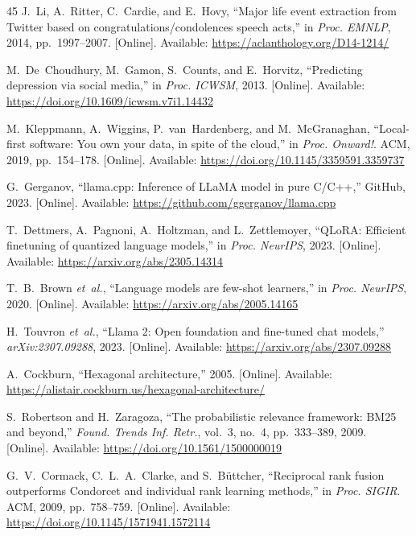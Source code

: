 \documentclass[conference]{IEEEtran}
\begin{document}
\begin{thebibliography}{45}
J.~Li, A.~Ritter, C.~Cardie, and E.~Hovy, ``Major life event extraction from Twitter based on congratulations/condolences speech acts,'' in \emph{Proc. EMNLP}, 2014, pp.~1997--2007. [Online]. Available: \url{https://aclanthology.org/D14-1214/}

M.~De~Choudhury, M.~Gamon, S.~Counts, and E.~Horvitz, ``Predicting depression via social media,'' in \emph{Proc. ICWSM}, 2013. [Online]. Available: \url{https://doi.org/10.1609/icwsm.v7i1.14432}

M.~Kleppmann, A.~Wiggins, P.~van~Hardenberg, and M.~McGranaghan, ``Local-first software: You own your data, in spite of the cloud,'' in \emph{Proc. Onward!}. ACM, 2019, pp.~154--178. [Online]. Available: \url{https://doi.org/10.1145/3359591.3359737}

G.~Gerganov, ``llama.cpp: Inference of LLaMA model in pure C/C++,'' GitHub, 2023. [Online]. Available: \url{https://github.com/ggerganov/llama.cpp}

T.~Dettmers, A.~Pagnoni, A.~Holtzman, and L.~Zettlemoyer, ``QLoRA: Efficient finetuning of quantized language models,'' in \emph{Proc. NeurIPS}, 2023. [Online]. Available: \url{https://arxiv.org/abs/2305.14314}

T.~B.~Brown \emph{et~al.}, ``Language models are few-shot learners,'' in \emph{Proc. NeurIPS}, 2020. [Online]. Available: \url{https://arxiv.org/abs/2005.14165}

H.~Touvron \emph{et~al.}, ``Llama 2: Open foundation and fine-tuned chat models,'' \emph{arXiv:2307.09288}, 2023. [Online]. Available: \url{https://arxiv.org/abs/2307.09288}

A.~Cockburn, ``Hexagonal architecture,'' 2005. [Online]. Available: \url{https://alistair.cockburn.us/hexagonal-architecture/}

S.~Robertson and H.~Zaragoza, ``The probabilistic relevance framework: BM25 and beyond,'' \emph{Found. Trends Inf. Retr.}, vol.~3, no.~4, pp.~333--389, 2009. [Online]. Available: \url{https://doi.org/10.1561/1500000019}

G.~V.~Cormack, C.~L.~A.~Clarke, and S.~B\"uttcher, ``Reciprocal rank fusion outperforms Condorcet and individual rank learning methods,'' in \emph{Proc. SIGIR}. ACM, 2009, pp.~758--759. [Online]. Available: \url{https://doi.org/10.1145/1571941.1572114}


\end{thebibliography}
\end{document}
